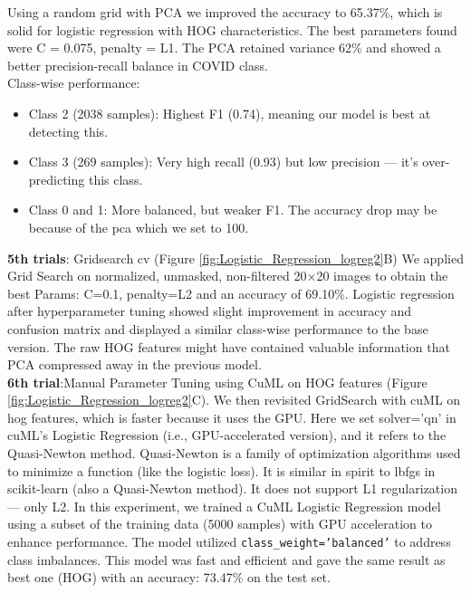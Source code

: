 \documentclass{article}
\begin{document}
Using a random grid with PCA we improved the accuracy to 65.37\%, which is solid for logistic regression with HOG characteristics. The best parameters found were C = 0.075, penalty = L1. The PCA retained variance 62\% and showed a better precision-recall balance in COVID class.\\
Class-wise performance: 
\begin{itemize}
    \item Class 2 (2038 samples): Highest F1 (0.74), meaning our model is best at detecting this.
    \item Class 3 (269 samples): Very high recall (0.93) but low precision — it’s over-predicting this class.
    \item Class 0 and 1: More balanced, but weaker F1.
The accuracy drop may be because of the pca which we set to 100.
\end{itemize}

\textbf{5th trials}: Gridsearch cv (Figure \ref{fig:Logistic_Regression_logreg2}B)
We applied Grid Search on normalized, unmasked, non-filtered 20×20 images to obtain the best Params: C=0.1, penalty=L2 and an accuracy of 69.10\%.
Logistic regression after hyperparameter tuning showed slight improvement in accuracy and confusion matrix and displayed a similar class-wise performance to the base version. The raw HOG features might have contained valuable information that PCA compressed away in the previous model.
\\
\textbf{6th trial}:Manual Parameter Tuning using CuML on HOG features (Figure \ref{fig:Logistic_Regression_logreg2}C).
We then revisited GridSearch with cuML on hog features, which is faster because it uses the GPU.
Here we set solver='qn' in cuML's Logistic Regression (i.e., GPU-accelerated version), and it refers to the Quasi-Newton method.
Quasi-Newton is a family of optimization algorithms used to minimize a function (like the logistic loss).
It is similar in spirit to lbfgs in scikit-learn (also a Quasi-Newton method). It does not support L1 regularization — only L2.
In this experiment, we trained a CuML Logistic Regression model using a subset of the training data (5000 samples) with GPU acceleration to enhance performance. The model utilized \texttt{class\_weight='balanced'} to address class imbalances. This model was fast and efficient and gave the same result as best one (HOG) with an accuracy: 73.47\% on the test set.
\end{document}
